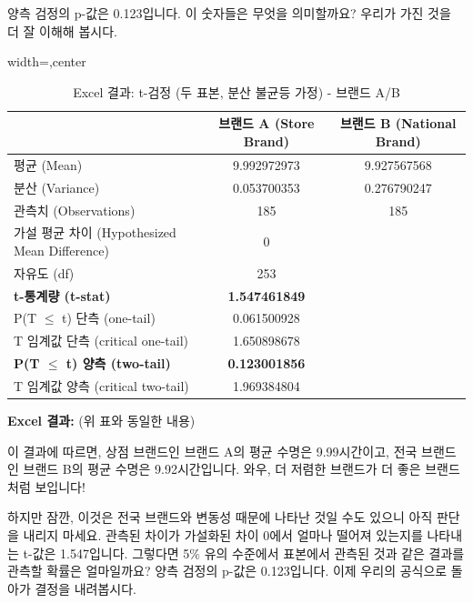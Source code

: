 \documentclass[11pt,a4paper]{book}
\theoremstyle{definition}
\begin{document}
\begin{infobox}[title=두 브랜드 비교 (6/8): 3단계 - p-값 계산 (두 모집단)]
양측 검정의 p-값은 0.123입니다. 이 숫자들은 무엇을 의미할까요? 우리가 가진 것을 더 잘 이해해 봅시다.

\begin{table}[h!]
    \centering
    \caption{Excel 결과: t-검정 (두 표본, 분산 불균등 가정) - 브랜드 A/B}
    \label{tab:excel_output_battery}
    \begin{adjustbox}{width=\textwidth,center}
    \begin{tabular}{lcc}
        \toprule
        \textbf{} & \textbf{브랜드 A (Store Brand)} & \textbf{브랜드 B (National Brand)} \\
        \midrule
        평균 (Mean) & 9.992972973 & 9.927567568 \\
        분산 (Variance) & 0.053700353 & 0.276790247 \\
        관측치 (Observations) & 185 & 185 \\
        가설 평균 차이 (Hypothesized Mean Difference) & 0 & \\
        자유도 (df) & 253 & \\
        \textbf{t-통계량 (t-stat)} & \textbf{1.547461849} & \\
        P(T $\le$ t) 단측 (one-tail) & 0.061500928 & \\
        T 임계값 단측 (critical one-tail) & 1.650898678 & \\
        \textbf{P(T $\le$ t) 양측 (two-tail)} & \textbf{0.123001856} & \\
        T 임계값 양측 (critical two-tail) & 1.969384804 & \\
        \bottomrule
    \end{tabular}
    \end{adjustbox}
\end{table}
\end{infobox}

\begin{infobox}[title=두 브랜드 비교 (7/8): 결과 해석 및 주의점]
\textbf{Excel 결과:} (위 표와 동일한 내용)

이 결과에 따르면, 상점 브랜드인 브랜드 A의 평균 수명은 9.99시간이고, 전국 브랜드인 브랜드 B의 평균 수명은 9.92시간입니다. 와우, 더 저렴한 브랜드가 더 좋은 브랜드처럼 보입니다!

하지만 잠깐, 이것은 전국 브랜드와 변동성 때문에 나타난 것일 수도 있으니 아직 판단을 내리지 마세요. 관측된 차이가 가설화된 차이 0에서 얼마나 떨어져 있는지를 나타내는 t-값은 1.547입니다. 그렇다면 5\% 유의 수준에서 표본에서 관측된 것과 같은 결과를 관측할 확률은 얼마일까요? 양측 검정의 p-값은 0.123입니다. 이제 우리의 공식으로 돌아가 결정을 내려봅시다.
\end{infobox}
\end{document}
